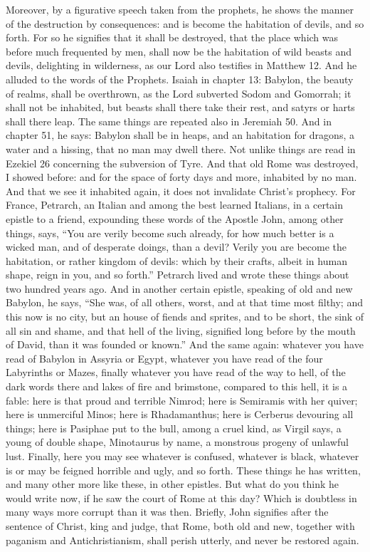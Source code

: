 Moreover, by a figurative speech taken from the prophets, he shows the manner of the destruction by consequences: and is become the habitation of devils, and so forth. For so he signifies that it shall be destroyed, that the place which was before much frequented by men, shall now be the habitation of wild beasts and devils, delighting in wilderness, as our Lord also testifies in Matthew 12. And he alluded to the words of the Prophets. Isaiah in chapter 13: Babylon, the beauty of realms, shall be overthrown, as the Lord subverted Sodom and Gomorrah; it shall not be inhabited, but beasts shall there take their rest, and satyrs or harts shall there leap. The same things are repeated also in Jeremiah 50. And in chapter 51, he says: Babylon shall be in heaps, and an habitation for dragons, a water and a hissing, that no man may dwell there. Not unlike things are read in Ezekiel 26 concerning the subversion of Tyre. And that old Rome was destroyed, I showed before: and for the space of forty days and more, inhabited by no man. And that we see it inhabited again, it does not invalidate Christ’s prophecy. For France, Petrarch, an Italian and among the best learned Italians, in a certain epistle to a friend, expounding these words of the Apostle John, among other things, says, “You are verily become such already, for how much better is a wicked man, and of desperate doings, than a devil? Verily you are become the habitation, or rather kingdom of devils: which by their crafts, albeit in human shape, reign in you, and so forth.” Petrarch lived and wrote these things about two hundred years ago. And in another certain epistle, speaking of old and new Babylon, he says, “She was, of all others, worst, and at that time most filthy; and this now is no city, but an house of fiends and sprites, and to be short, the sink of all sin and shame, and that hell of the living, signified long before by the mouth of David, than it was founded or known.” And the same again: whatever you have read of Babylon in Assyria or Egypt, whatever you have read of the four Labyrinths or Mazes, finally whatever you have read of the way to hell, of the dark words there and lakes of fire and brimstone, compared to this hell, it is a fable: here is that proud and terrible Nimrod; here is Semiramis with her quiver; here is unmerciful Minos; here is Rhadamanthus; here is Cerberus devouring all things; here is Pasiphae put to the bull, among a cruel kind, as Virgil says, a young of double shape, Minotaurus by name, a monstrous progeny of unlawful lust. Finally, here you may see whatever is confused, whatever is black, whatever is or may be feigned horrible and ugly, and so forth. These things he has written, and many other more like these, in other epistles. But what do you think he would write now, if he saw the court of Rome at this day? Which is doubtless in many ways more corrupt than it was then. Briefly, John signifies after the sentence of Christ, king and judge, that Rome, both old and new, together with paganism and Antichristianism, shall perish utterly, and never be restored again.

